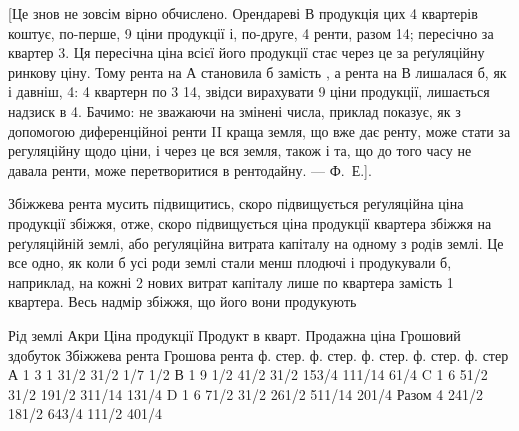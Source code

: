 [Це знов не зовсім вірно обчислено. Орендареві $В$ продукція цих 4 квартерів
коштує, по-перше, 9 ціни продукції і, по-друге,
4 ренти, разом 14; пересічно за квартер 3.
Ця пересічна ціна всієї його продукції стає через це за реґуляційну ринкову ціну. Тому рента на
$А$ становила б  замість , а рента на $В$ лишалася б, як і давніш, 4: 4 квартерн по 3 \deq{} 14, звідси вирахувати
9 ціни продукції, лишається надзиск в 4. Бачимо: не
зважаючи на змінені числа, приклад показує, як з допомогою диференційноі
ренти II краща земля, що вже дає ренту, може стати за регуляційну щодо ціни,
і через це вся земля, також і та, що до того часу не давала ренти, може перетворитися
в рентодайну. — Ф.~Е.].

Збіжжева рента мусить підвищитись, скоро підвищується реґуляційна
ціна продукції збіжжя, отже, скоро підвищується ціна продукції квартера збіжжя
на реґуляційній землі, або реґуляційна витрата капіталу на одному з родів
землі. Це все одно, як коли б усі роди землі стали менш плодючі і продукували
б, наприклад, на кожні 2 нових витрат капіталу лише по 
квартера замість 1 квартера. Весь надмір збіжжя, що його вони продукують

Рід землі    Акри    Ціна продукції    Продукт в кварт. Продажна  ціна    Грошовий  здобуток
Збіжжева рента    Грошова  рента
        ф. стер. ф. стер. ф. стер. ф. стер. ф. стер
А                    1    3             1            31/2       31/2        1/7            1/2
В                    1    9 1/2       41/2    31/2       153/4        111/14    61/4
C                    1    6             51/2    31/2        191/2        311/14    131/4
D                    1    6             71/2    31/2        261/2        511/14     201/4
Разом           4    241/2    181/2           643/4    111/2            401/4
\parbreak{}  %
